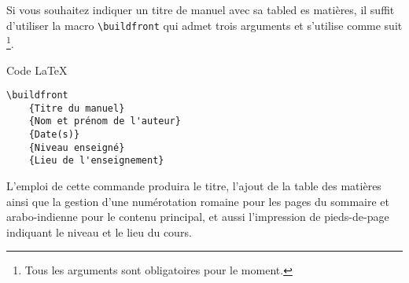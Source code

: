 Si vous souhaitez indiquer un titre de manuel avec sa tabled es matières, il suffit d'utiliser la macro \verb+\buildfront+ qui admet trois arguments et s'utilise comme suit
\footnote{
    Tous les arguments sont obligatoires pour le moment.
}.


\begin{frame-gene}{Code \LaTeX}
    \begin{verbatim}
\buildfront
    {Titre du manuel}
    {Nom et prénom de l'auteur}
    {Date(s)}
    {Niveau enseigné}
    {Lieu de l'enseignement}\end{verbatim}
\end{frame-gene}


L'emploi de cette commande produira le titre, l'ajout de la table des matières ainsi que la gestion d'une numérotation romaine pour les pages du sommaire et arabo-indienne pour le contenu principal, et aussi l'impression de pieds-de-page indiquant le niveau et le lieu du cours.
